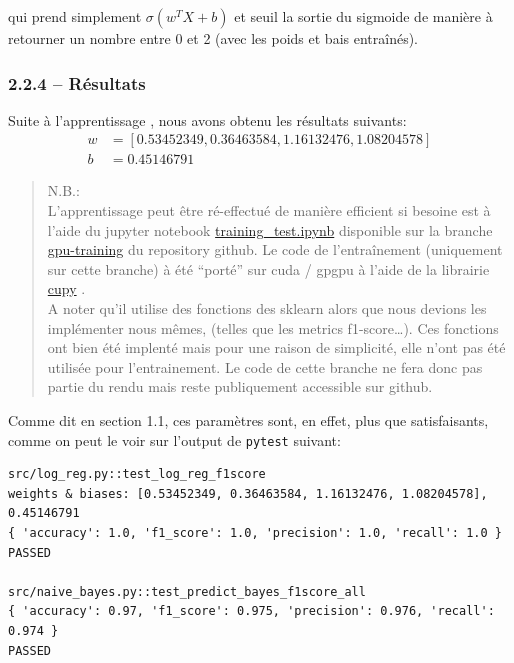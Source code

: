 \documentclass[
]{article}
\begin{document}
qui prend simplement \(\sigma(w^T X + b)\) et seuil la sortie du
sigmoide de manière à retourner un nombre entre 0 et 2 (avec les poids
et bais entraînés).

\newpage{}

\hypertarget{ruxe9sultats}{%
\subsubsection{2.2.4 -- Résultats}\label{ruxe9sultats}}

Suite à l'apprentissage , nous avons obtenu les résultats suivants:
\begin{align*}
    w &= [0.53452349, 0.36463584, 1.16132476, 1.08204578]\\
    b &= 0.45146791
\end{align*}

\begin{quote}
N.B.:\\
L'apprentissage peut être ré-effectué de manière efficient si besoine
est à l'aide du jupyter notebook
\href{https://github.com/David-Kyrat/13X005-AI-Project/blob/gpu-training/training_test.ipynb}{training\_test.ipynb}
disponible sur la branche
\href{https://github.com/David-Kyrat/13X005-AI-Project/blob/gpu-training/training_test.ipynb}{gpu-training}
du repository github. Le code de l'entraînement (uniquement sur cette
branche) à été ``porté'' sur cuda / gpgpu à l'aide de la librairie
\href{https://cupy.dev}{cupy} \cite{NumPySciPyGPU}.\\
A noter qu'il utilise des fonctions des sklearn alors que nous devions
les implémenter nous mêmes, (telles que les metrics f1-score\ldots). Ces
fonctions ont bien été implenté mais pour une raison de simplicité, elle
n'ont pas été utilisée pour l'entrainement. Le code de cette branche ne
fera donc pas partie du rendu mais reste publiquement accessible sur
github.
\end{quote}

\vspace{0.3cm}

Comme dit en section 1.1, ces paramètres sont, en effet, plus que
satisfaisants, comme on peut le voir sur l'output de \texttt{pytest}
suivant:

\begin{lstlisting}
src/log_reg.py::test_log_reg_f1score 
weights & biases: [0.53452349, 0.36463584, 1.16132476, 1.08204578], 0.45146791  
{ 'accuracy': 1.0, 'f1_score': 1.0, 'precision': 1.0, 'recall': 1.0 }
PASSED

src/naive_bayes.py::test_predict_bayes_f1score_all  
{ 'accuracy': 0.97, 'f1_score': 0.975, 'precision': 0.976, 'recall': 0.974 }
PASSED
\end{lstlisting}
\end{document}
